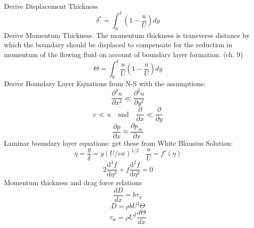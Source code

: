 \documentclass{article}
\begin{document}
Derive Displacement Thickness
\begin{equation}
  \delta^* = \int_0^\delta (1-\frac{u}{U})dy
\end{equation}
\newline
\newline
Derive Momentum Thickness. The momentum thickness is transverse distance by which the boundary should be displaced to compensate for the reduction in momentum of the flowing fluid on account of boundary layer formation. (ch. 9)
\begin{equation}
  \Theta = \int_0^\delta \frac{u}{U}(1-\frac{u}{U})dy
\end{equation}
\newline
\newline
Derive Boundary Layer Equations from N-S with the assumptions:
\begin{equation}
  \frac{\partial^2 u}{\partial x^2} \ll \frac{\partial^2 u}{\partial y^2}
\end{equation}
\begin{equation}
  v \ll u\quad\text{and}\quad\frac{\partial}{\partial x} \ll \frac{\partial}{\partial y}
\end{equation}
\begin{equation}
  \frac{\partial p}{\partial x} \approx \frac{\partial p_\infty}{\partial x}
\end{equation}
\newline
\newline
Laminar boundary layer equations: get these from White
\newline
\newline
Blausius Solution:
\begin{equation}
  \eta=\frac{y}{\delta}=y(U/\nu x)^{1/2}\quad\frac{u}{U}=f'(\eta)
\end{equation}
\begin{equation}
  2 \frac{\text{d}^3 f}{\text{d} \eta^3} + f \frac{\text{d}^2 f}{\text{d} \eta^2} = 0
\end{equation}
\newline
\newline
Momentum thickness and drag force relations
\begin{equation}
  \frac{dD}{dx} = b \tau_w
\end{equation}
\begin{equation}
  D = \rho b U^2 \Theta
\end{equation}
\begin{equation}
  \tau_\text{w} = \rho U^2 \frac{d \Theta}{d x}
\end{equation}
\end{document}
